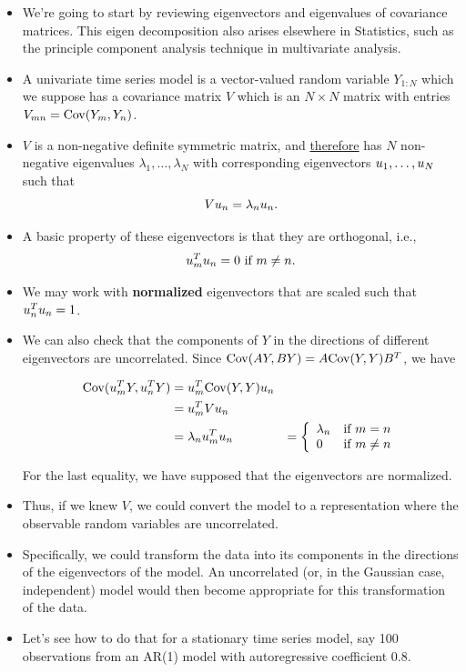 \documentclass[]{article}
\begin{document}
\begin{itemize}
\item
  We're going to start by reviewing eigenvectors and eigenvalues of
  covariance matrices. This eigen decomposition also arises elsewhere in
  Statistics, such as the principle component analysis technique in
  multivariate analysis.
\item
  A univariate time series model is a vector-valued random variable
  \(Y_{1:N}\) which we suppose has a covariance matrix \(V\) which is an
  \(N\times N\) matrix with entries \(V_{mn}=\mathrm{Cov}(Y_m,Y_n)\).
\item
  \(V\) is a non-negative definite symmetric matrix, and
  \href{https://en.wikipedia.org/wiki/Eigendecomposition_of_a_matrix\#Real_symmetric_matrices}{therefore}
  has \(N\) non-negative eigenvalues \(\lambda_1,\dots,\lambda_N\) with
  corresponding eigenvectors \(u_1,\dots,u_N\) such that
  \[ V u_n = \lambda_n u_n.\]
\item
  A basic property of these eigenvectors is that they are orthogonal,
  i.e., \[ u_m^T u_n = 0 \mbox{ if $m\neq n$}.\]
\item
  We may work with \textbf{normalized} eigenvectors that are scaled such
  that \(u_n^T u_n = 1\).
\item
  We can also check that the components of \(Y\) in the directions of
  different eigenvectors are uncorrelated. Since
  \(\mathrm{Cov}(AY,BY)=A\mathrm{Cov}(Y,Y)B^T\), we have

  \begin{eqnarray}
  \mathrm{Cov}(u_m^T Y, u_n^T Y) &= u_m^T \mathrm{Cov}(Y,Y) u_n
  \\
  &= u_m^T V u_n
  \\
  &=\lambda_n u_m^T u_n 
  &= \left\{\begin{array}{ll} 
  \lambda_n & \mbox{if $m=n$} \\ 0 & \mbox{if $m\neq n$}
  \end{array}\right.
  \end{eqnarray}

  For the last equality, we have supposed that the eigenvectors are
  normalized.
\item
  Thus, if we knew \(V\), we could convert the model to a representation
  where the observable random variables are uncorrelated.
\item
  Specifically, we could transform the data into its components in the
  directions of the eigenvectors of the model. An uncorrelated (or, in
  the Gaussian case, independent) model would then become appropriate
  for this transformation of the data.
\item
  Let's see how to do that for a stationary time series model, say 100
  observations from an AR(1) model with autoregressive coefficient 0.8.
\end{itemize}
\end{document}

